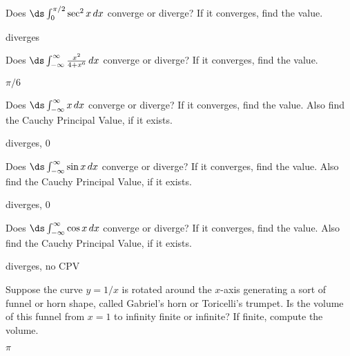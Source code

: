 \begin{exercises}
\begin{exercise} Does $\ds\int_0^{\pi/2} \sec^2x\,dx$ converge or diverge? If
it converges, find the value.
\begin{answer} diverges
\end{answer}\end{exercise}

\begin{exercise} Does $\ds\int_{-\infty}^\infty{x^2\over 4+x^6}\,dx$ 
converge or diverge? If
it converges, find the value.
\begin{answer} $\pi/6$
\end{answer}\end{exercise}

\begin{exercise} Does $\ds\int_{-\infty}^\infty x\,dx$ 
converge or diverge? If
it converges, find the value. Also find the Cauchy Principal Value, if
it exists.
\begin{answer} diverges, $0$
\end{answer}\end{exercise}

\begin{exercise} Does $\ds\int_{-\infty}^\infty \sin x\,dx$ 
converge or diverge? If
it converges, find the value. Also find the Cauchy Principal Value, if
it exists.
\begin{answer} diverges, $0$
\end{answer}\end{exercise}

\begin{exercise} Does $\ds\int_{-\infty}^\infty \cos x\,dx$ 
converge or diverge? If
it converges, find the value. Also find the Cauchy Principal Value, if
it exists.
\begin{answer} diverges, no CPV
\end{answer}\end{exercise}

\begin{exercise} \relax
\label{exer:gabriels horn}
Suppose the curve $y=1/x$ is rotated around the $x$-axis
generating a sort of funnel or horn shape, called {\dfont
  Gabriel's horn\/} or {\dfont Toricelli's
  trumpet}. Is the volume of this funnel
from $x=1$ to infinity finite or infinite? If finite, compute the
volume.  
\begin{answer} $\pi$ 
\end{answer}\end{exercise}


\end{exercises}
